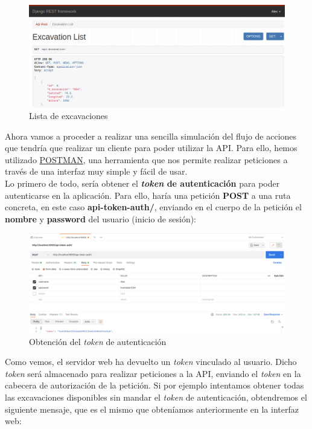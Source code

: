         \begin{figure}[H]
            \centering
            \includegraphics[scale=0.30]{imagenes/list-excavations.png}
            \caption{Lista de excavaciones}
            \label{fig:list-excavations}
        \end{figure}

Ahora vamos a proceder a realizar una sencilla simulación del flujo de acciones que tendría
que realizar un cliente para poder utilizar la API. Para ello, hemos utilizado
\href{https://www.postman.com/}{POSTMAN}, una herramienta que nos permite realizar
peticiones a través de una interfaz muy simple y fácil de usar.\\

Lo primero de todo, sería obtener el \textbf{\textit{token} de autenticación} para poder
autenticarse en la aplicación. Para ello, haría una petición \textbf{POST} a una ruta
concreta, en este caso \textbf{api-token-auth/}, enviando en el cuerpo de la petición el
\textbf{nombre} y \textbf{password} del usuario (inicio de sesión):

        \begin{figure}[H]
            \centering
            \includegraphics[scale=0.25]{imagenes/get-token.png}
            \caption{Obtención del \textit{token} de autenticación}
            \label{fig:get-token}
        \end{figure}

Como vemos, el servidor web ha devuelto un \textit{token} vinculado al usuario. Dicho
\textit{token} será almacenado para realizar peticiones a la API, enviando el \textit{token}
en la cabecera de autorización de la petición. Si por ejemplo intentamos obtener todas las
excavaciones disponibles sin mandar el \textit{token} de autenticación, obtendremos el
siguiente mensaje, que es el mismo que obteníamos anteriormente en la interfaz web:

